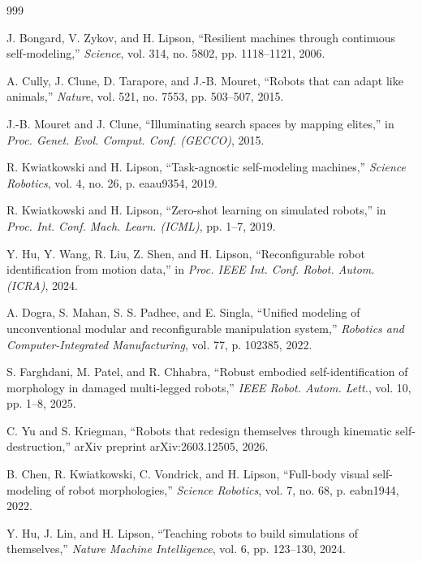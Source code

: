 \documentclass[12pt,a4paper,oneside]{report}
\begin{document}
\begin{thebibliography}{999}

J. Bongard, V. Zykov, and H. Lipson, ``Resilient machines through continuous self-modeling,'' \textit{Science}, vol. 314, no. 5802, pp. 1118--1121, 2006.

A. Cully, J. Clune, D. Tarapore, and J.-B. Mouret, ``Robots that can adapt like animals,'' \textit{Nature}, vol. 521, no. 7553, pp. 503--507, 2015.

J.-B. Mouret and J. Clune, ``Illuminating search spaces by mapping elites,'' in \textit{Proc. Genet. Evol. Comput. Conf. (GECCO)}, 2015.

R. Kwiatkowski and H. Lipson, ``Task-agnostic self-modeling machines,'' \textit{Science Robotics}, vol. 4, no. 26, p. eaau9354, 2019.

R. Kwiatkowski and H. Lipson, ``Zero-shot learning on simulated robots,'' in \textit{Proc. Int. Conf. Mach. Learn. (ICML)}, pp. 1--7, 2019.

Y. Hu, Y. Wang, R. Liu, Z. Shen, and H. Lipson, ``Reconfigurable robot identification from motion data,'' in \textit{Proc. IEEE Int. Conf. Robot. Autom. (ICRA)}, 2024.

A. Dogra, S. Mahan, S. S. Padhee, and E. Singla, ``Unified modeling of unconventional modular and reconfigurable manipulation system,'' \textit{Robotics and Computer-Integrated Manufacturing}, vol. 77, p. 102385, 2022.

S. Farghdani, M. Patel, and R. Chhabra, ``Robust embodied self-identification of morphology in damaged multi-legged robots,'' \textit{IEEE Robot. Autom. Lett.}, vol. 10, pp. 1--8, 2025.

C. Yu and S. Kriegman, ``Robots that redesign themselves through kinematic self-destruction,'' arXiv preprint arXiv:2603.12505, 2026.

B. Chen, R. Kwiatkowski, C. Vondrick, and H. Lipson, ``Full-body visual self-modeling of robot morphologies,'' \textit{Science Robotics}, vol. 7, no. 68, p. eabn1944, 2022.

Y. Hu, J. Lin, and H. Lipson, ``Teaching robots to build simulations of themselves,'' \textit{Nature Machine Intelligence}, vol. 6, pp. 123--130, 2024.


\end{thebibliography}
\end{document}

